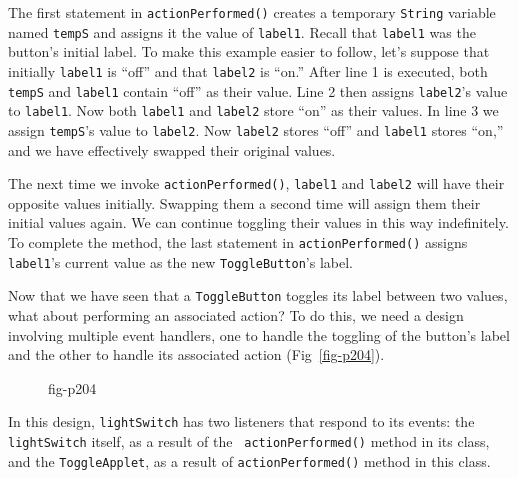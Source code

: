 
\noindent The first statement in {\tt actionPerformed()} creates a temporary
{\tt String} variable named {\tt tempS} and assigns it the value of
{\tt label1}. Recall that \mbox{\tt label1} was the button's initial
label.  To make this example easier to follow, let's suppose that
initially {\tt label1} is ``off'' and that {\tt label2} is ``on.'' 
After line 1 is executed, both {\tt tempS} and {\tt label1}
contain ``off'' as their value.  Line 2 then assigns {\tt label2}'s
value to {\tt label1}.  Now both {\tt label1} and {\tt label2}
store ``on'' as their values.   In line 3 we assign {\tt tempS}'s value
to {\tt label2}. Now {\tt label2} stores ``off'' and {\tt label1}
stores ``on,'' and we have effectively swapped their original values.

The next time we invoke {\tt actionPerformed()}, {\tt label1}
and {\tt label2} will have their opposite values initially.  
Swapping them a second time will assign them their initial values
again.  We can continue toggling their values in this way
indefinitely.  To complete the method, the last statement in
{\tt actionPerformed()} assigns {\tt label1}'s current value as the new
{\tt ToggleButton}'s label.

Now that we have seen that a {\tt ToggleButton} toggles its label
between two values, what about performing an associated action?
 To do this, we need a design
involving multiple event handlers, one to handle the toggling of the
button's label and the other to handle its associated action
(Fig~\ref{fig-p204}).
\begin{figure}[h!]
{fig-p204}
\end{figure}
In this design, {\tt lightSwitch} has two listeners that respond to
its events: the {\tt lightSwitch} itself, as a result of the {\tt
actionPerformed()} method in its class, and the {\tt ToggleApplet}, as
a result of {\tt actionPerformed()} method in this class.

